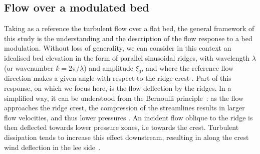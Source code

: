 \subsection{Flow over a modulated bed}
\label{theoretical_framework}
Taking as a reference the turbulent flow over a flat bed, the general framework of this study is the understanding and the description of the flow response to a bed modulation. Without loss of generality, we can consider in this context an idealised bed elevation in the form of parallel sinusoidal ridges, with wavelength $\lambda$ (or wavenumber $k = 2\pi/\lambda$) and amplitude $\xi_0$, and where the reference flow direction makes a given angle with respect to the ridge crest \citep{Andreotti2012}. Part of this response, on which we focus here, is the flow deflection by the ridges. In a simplified way, it can be understood from the Bernoulli principle~\citep{Hesp2015}: as the flow approaches the ridge crest, the compression of the streamlines results in larger flow velocities, and thus lower pressures \citep{Rubin1987}. An incident flow oblique to the ridge is then deflected towards lower pressure zones, i.e towards the crest. Turbulent dissipation tends to increase this effect downstream, resulting in along the crest wind deflection in the lee side~\citep{Gadal2019}.

